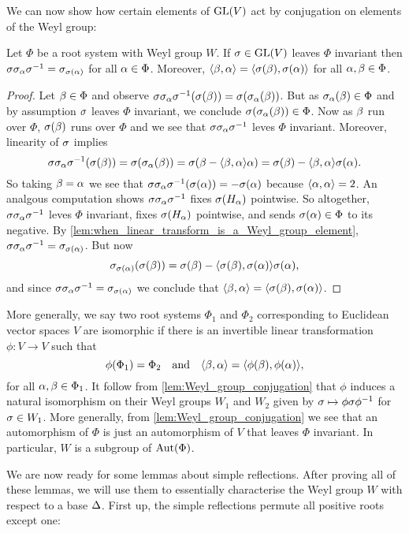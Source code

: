 \documentclass[12pt,reqno,oneside]{amsart}
\begin{document}
    We can now show how certain elements of $\mathrm{GL}(V)$ act by conjugation on elements of the Weyl group:

    \begin{lemma}\label{lem:Weyl_group_conjugation}
        Let $\Phi$ be a root system with Weyl group $W$. If $\sigma \in \mathrm{GL}(V)$ leaves $\Phi$ invariant then $\sigma\sigma_{\alpha}\sigma^{-1} = \sigma_{\sigma(\alpha)}$ for all $\alpha \in \Phi$. Moreover, $\langle\beta,\alpha\rangle = \langle\sigma(\beta),\sigma(\alpha)\rangle$ for all $\alpha,\beta \in \Phi$.
    \end{lemma}
    \begin{proof}
        Let $\beta \in \Phi$ and observe $\sigma\sigma_{\alpha}\sigma^{-1}(\sigma(\beta)) = \sigma(\sigma_{\alpha}(\beta))$. But as $\sigma_{\alpha}(\beta) \in \Phi$ and by assumption $\sigma$ leaves $\Phi$ invariant, we conclude $\sigma(\sigma_{\alpha}(\beta)) \in \Phi$. Now as $\beta$ run over $\Phi$, $\sigma(\beta)$ runs over $\Phi$ and we see that $\sigma\sigma_{\alpha}\sigma^{-1}$ leves $\Phi$ invariant. Moreover, linearity of $\sigma$ implies
        \[
            \sigma\sigma_{\alpha}\sigma^{-1}(\sigma(\beta)) = \sigma(\sigma_{\alpha}(\beta)) = \sigma(\beta-\langle\beta,\alpha\rangle\alpha) = \sigma(\beta)-\langle\beta,\alpha\rangle\sigma(\alpha).
        \]
        So taking $\beta = \alpha$ we see that $\sigma\sigma_{\alpha}\sigma^{-1}(\sigma(\alpha)) = -\sigma(\alpha)$ because $\langle\alpha,\alpha\rangle = 2$. An analgous computation shows $\sigma\sigma_{\alpha}\sigma^{-1}$ fixes $\sigma(H_{\alpha})$ pointwise. So altogether, $\sigma\sigma_{\alpha}\sigma^{-1}$ leves $\Phi$ invariant, fixes $\sigma(H_{\alpha})$ pointwise, and sends $\sigma(\alpha) \in \Phi$ to its negative. By \cref{lem:when_linear_transform_is_a_Weyl_group_element}, $\sigma\sigma_{\alpha}\sigma^{-1} = \sigma_{\sigma(\alpha)}$. But now
        \[
            \sigma_{\sigma(\alpha)}(\sigma(\beta)) = \sigma(\beta)-\langle\sigma(\beta),\sigma(\alpha)\rangle\sigma(\alpha),
        \]
        and since $\sigma\sigma_{\alpha}\sigma^{-1} = \sigma_{\sigma(\alpha)}$ we conclude that $\langle\beta,\alpha\rangle = \langle\sigma(\beta),\sigma(\alpha)\rangle$.
    \end{proof}

    More generally, we say two root systems $\Phi_{1}$ and $\Phi_{2}$ corresponding to Euclidean vector spaces $V$ are isomorphic if there is an invertible linear transformation $\phi:V \to V$ such that
    \[
        \phi(\Phi_{1}) = \Phi_{2} \quad \text{and} \quad \langle\beta,\alpha\rangle = \langle\phi(\beta),\phi(\alpha)\rangle,
    \]
    for all $\alpha,\beta \in \Phi_{1}$. It follow from \cref{lem:Weyl_group_conjugation} that $\phi$ induces a natural isomorphism on their Weyl groups $W_{1}$ and $W_{2}$ given by $\sigma \mapsto \phi\sigma\phi^{-1}$ for $\sigma \in W_{1}$. More generally, from \cref{lem:Weyl_group_conjugation} we see that an automorphism of $\Phi$ is just an automorphism of $V$ that leaves $\Phi$ invariant. In particular, $W$ is a subgroup of $\operatorname{\mathrm{Aut}}(\Phi)$.

    We are now ready for some lemmas about simple reflections. After proving all of these lemmas, we will use them to essentially characterise the Weyl group $W$ with respect to a base $\Delta$. First up, the simple reflections permute all positive roots except one:
\end{document}
